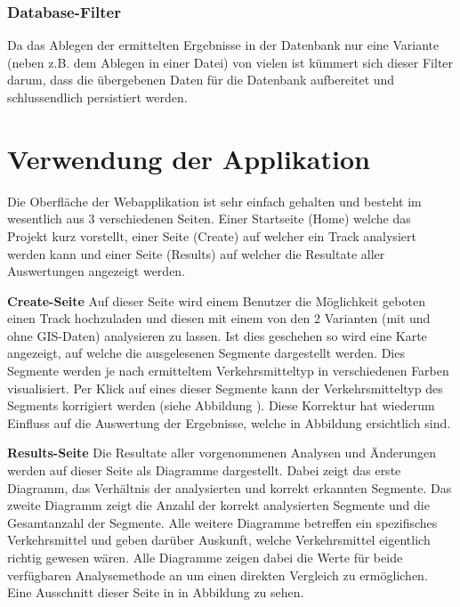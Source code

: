
\subsubsection{Database-Filter}
Da das Ablegen der ermittelten Ergebnisse in der Datenbank  nur eine Variante (neben z.B. dem Ablegen  in einer Datei) von vielen ist kümmert sich dieser Filter darum, dass die übergebenen Daten für die Datenbank aufbereitet und schlussendlich persistiert werden.

\section{Verwendung der Applikation}
Die Oberfläche der Webapplikation ist sehr einfach gehalten und besteht im wesentlich aus 3 verschiedenen Seiten. Einer Startseite (Home) welche das Projekt kurz vorstellt, einer Seite (Create) auf welcher ein Track analysiert werden kann und einer Seite (Results) auf welcher die Resultate aller Auswertungen angezeigt werden.

\textbf{Create-Seite}
Auf dieser Seite wird einem Benutzer die Möglichkeit geboten einen Track hochzuladen und diesen mit einem von den 2 Varianten (mit und ohne GIS-Daten) analysieren zu lassen. Ist dies geschehen so wird eine Karte angezeigt, auf welche die ausgelesenen Segmente dargestellt werden. Dies Segmente werden je nach ermitteltem Verkehrsmitteltyp in verschiedenen Farben visualisiert. Per Klick auf eines dieser Segmente kann der Verkehrsmitteltyp des Segments korrigiert werden (siehe Abbildung ). Diese Korrektur hat wiederum Einfluss auf die Auswertung der Ergebnisse, welche in Abbildung  ersichtlich sind.


\textbf{Results-Seite}
Die Resultate aller vorgenommenen Analysen und Änderungen werden auf dieser Seite als Diagramme dargestellt. Dabei zeigt das erste Diagramm, das Verhältnis der analysierten und korrekt erkannten Segmente. Das zweite Diagramm zeigt die Anzahl der korrekt analysierten Segmente und die Gesamtanzahl der Segmente. Alle weitere Diagramme betreffen ein spezifisches Verkehrsmittel und geben darüber Auskunft, welche Verkehrsmittel eigentlich richtig gewesen wären. Alle Diagramme zeigen dabei die Werte für beide verfügbaren Analysemethode an um einen direkten Vergleich zu ermöglichen. Eine Ausschnitt dieser Seite in in Abbildung  zu sehen.

